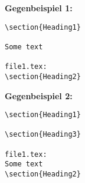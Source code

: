 \begin{itemize}
  \textbf{Gegenbeispiel 1:}
  \begin{verbatim}
\section{Heading1}

Some text

file1.tex:
\section{Heading2}
  \end{verbatim}

  \textbf{Gegenbeispiel 2:}
  \begin{verbatim}
\section{Heading1}

\section{Heading3}

file1.tex:
Some text
\section{Heading2}
  \end{verbatim}
\end{itemize}
